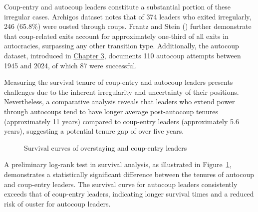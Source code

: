 \documentclass[
  12pt,
]{report}
\begin{document}
Coup-entry and autocoup leaders constitute a substantial portion of
these irregular cases. Archigos dataset notes that of 374 leaders who
exited irregularly, 246 (65.8\%) were ousted through coups. Frantz and
Stein () further demonstrate that
coup-related exits account for approximately one-third of all exits in
autocracies, surpassing any other transition type. Additionally, the
autocoup dataset, introduced in \hyperref[sec-chapter3]{Chapter 3},
documents 110 autocoup attempts between 1945 and 2024, of which 87 were
successful.

Measuring the survival tenure of coup-entry and autocoup leaders
presents challenges due to the inherent irregularity and uncertainty of
their positions. Nevertheless, a comparative analysis reveals that
leaders who extend power through autocoups tend to have longer average
post-autocoup tenures (approximately 11 years) compared to coup-entry
leaders (approximately 5.6 years), suggesting a potential tenure gap of
over five years.

\begin{figure}


\caption{\label{fig-logrank}Survival curves of overstaying and
coup-entry leaders}

\end{figure}%

A preliminary log-rank test in survival analysis, as illustrated in
Figure~\ref{fig-logrank}, demonstrates a statistically significant
difference between the tenures of autocoup and coup-entry leaders. The
survival curve for autocoup leaders consistently exceeds that of
coup-entry leaders, indicating longer survival times and a reduced risk
of ouster for autocoup leaders.
\end{document}
